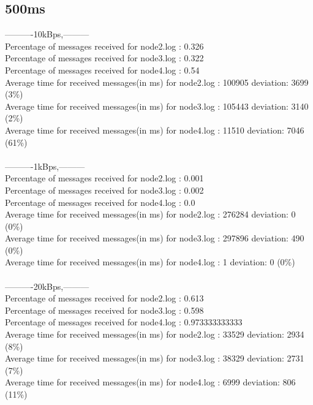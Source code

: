     \subsection{500ms}\label{RawResults:500ms}
        ----------10kBps,---------\\
        Percentage of messages received for node2.log : 0.326\\
        Percentage of messages received for node3.log : 0.322\\
        Percentage of messages received for node4.log : 0.54\\
        Average time for received messages(in ms) for  node2.log : 100905   deviation: 3699 (3\%)\\
        Average time for received messages(in ms) for  node3.log : 105443   deviation: 3140 (2\%)\\
        Average time for received messages(in ms) for  node4.log : 11510    deviation: 7046 (61\%)\\\\
        ----------1kBps,---------\\
        Percentage of messages received for node2.log : 0.001\\
        Percentage of messages received for node3.log : 0.002\\
        Percentage of messages received for node4.log : 0.0\\
        Average time for received messages(in ms) for  node2.log : 276284   deviation: 0 (0\%)\\
        Average time for received messages(in ms) for  node3.log : 297896   deviation: 490 (0\%)\\
        Average time for received messages(in ms) for  node4.log : 1    deviation: 0 (0\%)\\\\
        ----------20kBps,---------\\
        Percentage of messages received for node2.log : 0.613\\
        Percentage of messages received for node3.log : 0.598\\
        Percentage of messages received for node4.log : 0.973333333333\\
        Average time for received messages(in ms) for  node2.log : 33529    deviation: 2934 (8\%)\\
        Average time for received messages(in ms) for  node3.log : 38329    deviation: 2731 (7\%)\\
        Average time for received messages(in ms) for  node4.log : 6999     deviation: 806 (11\%)\\\\
